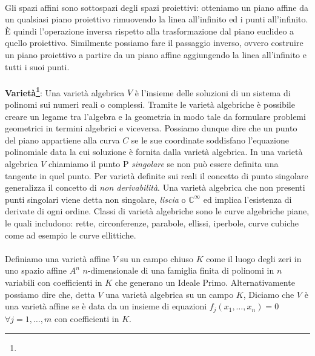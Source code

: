 \documentclass[a4paper,12pt]{tesiinfo}
\renewcommand{\footnotesize}{\fontsize{9pt}{11pt}\selectfont}
\begin{document}
\\
Gli spazi affini sono sottospazi degli spazi proiettivi: otteniamo un piano affine da un qualsiasi piano proiettivo rimuovendo la linea all'infinito ed i punti all'infinito. \`E quindi l'operazione inversa rispetto alla trasformazione dal piano euclideo a quello proiettivo. Similmente possiamo fare il passaggio inverso, ovvero costruire un piano proiettivo a partire da un piano affine aggiungendo la linea all'infinito e tutti i suoi punti.
\\\\
%
%
%
\textbf{Variet\`a\footnote{\footnotesize{In inglese dette \textbf{Manifold}}}}: Una variet\`a algebrica $V$ \`e l'insieme delle soluzioni di un sistema di polinomi sui numeri reali o complessi. Tramite le variet\`a algebriche \`e possibile creare un legame tra l'algebra e la geometria in modo tale da formulare problemi geometrici in termini algebrici e viceversa. Possiamo dunque dire che un punto del piano appartiene alla curva $C$ se le sue coordinate soddisfano l'equazione polinomiale data la cui soluzione \`e fornita dalla variet\`a algebrica.
In una variet\`a algebrica $V$ chiamiamo il punto P \textit{singolare} se non pu\`o essere definita una tangente in quel punto. Per variet\`a definite sui reali il concetto di punto singolare generalizza il concetto di \textit{non derivabilit\`a}. Una variet\`a algebrica che non presenti punti singolari viene detta non singolare, \textit{liscia} o $\mathbb{C}^ {\infty}$ ed implica l'esistenza di derivate di ogni ordine.
Classi di variet\`a algebriche sono le curve algebriche piane, le quali includono: rette, circonferenze, parabole, ellissi, iperbole, curve cubiche come ad esempio le curve ellittiche.
\\\\
Definiamo una variet\`a affine $V$ su un campo chiuso $K$ come il luogo degli zeri in uno spazio affine $A^n$ $n$-dimensionale di una famiglia finita di polinomi in $n$ variabili con coefficienti in $K$ che generano un Ideale Primo. Alternativamente possiamo dire che, detta $V$ una variet\`a algebrica su un campo $K$, Diciamo che $V$ \`e una variet\`a affine se \`e data da un insieme di equazioni $f_j(x_1, \ldots , x_n) = 0$ $\forall j = 1, \ldots, m$ con coefficienti in $K$.
\end{document}
